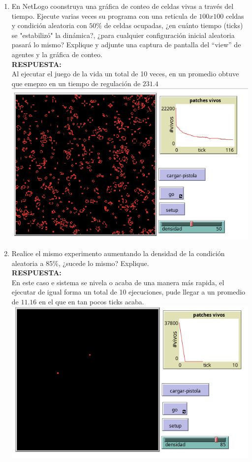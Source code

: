 \documentclass[12pt]{article}
\begin{document}
\begin{enumerate}
    \item En NetLogo coonstruya una gráfica de conteo de celdas vivas a través del tiempo. Ejecute varias veces su programa con una reticula de $100x100$ celdas 
    y condición aleatoria con $50\%$ de celdas ocupadas, ¿en cuánto
    tiempo (ticks) se "estabilizó" la dinámica?, ¿para cualquier configuración
    inicial aleatoria pasará lo mismo? Explique y adjunte una captura de
    pantalla del “view” de agentes y la gráfica de conteo.\\
    \textbf{\color{red} RESPUESTA:}\\
    Al ejecutar el juego de la vida un total de 10 veces, en un promedio obtuve que emepzo en un tiempo de regulación de $231.4$\\

    \includegraphics[scale = 0.40]{images/50juego.png}
    
    \item Realice el mismo experimento aumentando la densidad de la condición
    aleatoria a 85\%, ¿sucede lo mismo? Explique.\\
    \textbf{\color{red} RESPUESTA:}\\
    En este caso e sistema se nivela o acaba de una manera más rapida, el ejecutar de igual forma un total de 10 ejecuciones, pude llegar a un promedio de $11.16$
    en el que en tan pocos ticks acaba.\\

    \includegraphics[scale = 0.40]{images/juego85.png}
    

\end{enumerate}
\end{document}
